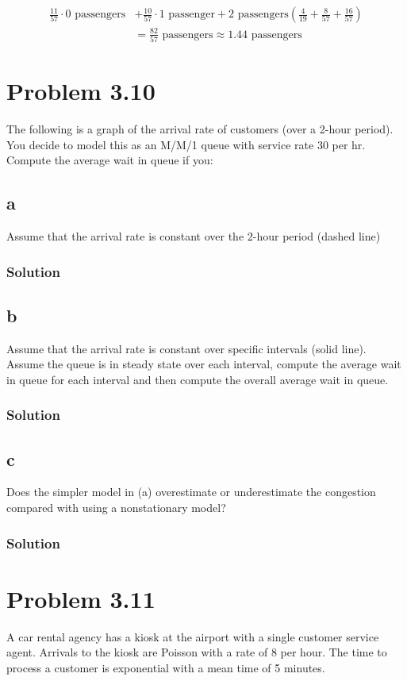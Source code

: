 \documentclass[letterpaper]{amsart}
\begin{document}
\begin{equation}
\begin{aligned}
  \frac{11}{57}\cdot 0\text{ passengers}
  &+
  \frac{10}{57}\cdot 1\text{ passenger}
  +
  2\text{ passengers}
  \left(
  \frac{4}{19}
  +
  \frac{8}{57}
  +
  \frac{16}{57}
  \right)\\
  &=
  \frac{82}{57}\text{ passengers}
  \approx 1.44\text{ passengers}
\end{aligned}
\end{equation}


\section{Problem 3.10} %
The following is a graph of the arrival rate of customers (over a 2-hour
period). You decide to model this as an M/M/1 queue with service rate 30
per hr. Compute the average wait in queue if you:
\subsection*{a}
Assume that the arrival rate is constant over the 2-hour period (dashed
line)
\subsubsection*{Solution}
\subsection*{b}
Assume that the arrival rate is constant over specific intervals (solid
line). Assume the queue is in steady state over each interval, compute
the average wait in queue for each interval and then compute the overall
average wait in queue.
\subsubsection*{Solution}
\subsection*{c}
Does the simpler model in (a) overestimate or underestimate the congestion compared with using a nonstationary model?
\subsubsection*{Solution}

\section{Problem 3.11} %
A car rental agency has a kiosk at the airport with a single customer service
agent. Arrivals to the kiosk are Poisson with a rate of 8 per hour. The time
to process a customer is exponential with a mean time of 5 minutes.
\end{document}
